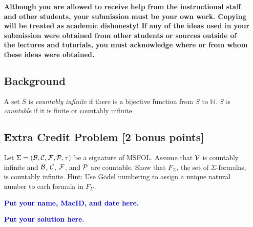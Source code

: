 \documentclass[11pt,fleqn]{article}
\newcommand{\sB}{\mbox{$\cal B$}}
\newcommand{\sC}{\mbox{$\cal C$}}
\newcommand{\sF}{\mbox{$\cal F$}}
\newcommand{\sP}{\mbox{$\cal P$}}
\newcommand{\sV}{\mbox{$\cal V$}}
\begin{document}
\textbf{Although you are allowed to receive help from the
  instructional staff and other students, your submission must be your
  own work.  Copying will be treated as academic dishonesty! If any of
  the ideas used in your submission were obtained from other students
  or sources outside of the lectures and tutorials, you must
  acknowledge where or from whom these ideas were obtained.}

\newpage

\subsection*{Background}

A set $S$ is \emph{countably infinite} if there is a bijective
function from $S$ to $\mathbb{N}$.  $S$ is \emph{countable} if it is
finite or countably infinite.  


\subsection*{Extra Credit Problem \textbf{[2 bonus points]}}

Let $\Sigma = (\sB,\sC,\sF,\sP,\tau)$ be a signature of MSFOL.  Assume
that $\sV$ is countably infinite and $\sB$, $\sC$, $\sF$, and $\sP$
are countable.  Show that $F_{\Sigma}$, the set of $\Sigma$-formulas,
is countably infinite.  Hint: Use G\"odel numbering to assign a unique
natural number to each formula in $F_{\Sigma}$.


\bigskip

\noindent
\textcolor{blue}{\textbf{Put your name, MacID, and date here.}}

\bigskip

\noindent
\textcolor{blue}{\textbf{Put your solution here.}}
\end{document}
